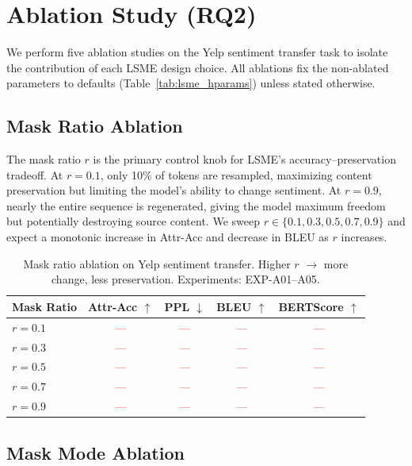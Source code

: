 \documentclass{article}
\newcommand{\tbd}[1]{\textcolor{red}{#1}}  %
\begin{document}
\section{Ablation Study (RQ2)}
\label{sec:ablation}

We perform five ablation studies on the Yelp sentiment transfer task to isolate the contribution of each LSME design choice. All ablations fix the non-ablated parameters to defaults (Table~\ref{tab:lsme_hparams}) unless stated otherwise.

\subsection{Mask Ratio Ablation}

The mask ratio $r$ is the primary control knob for LSME's accuracy--preservation tradeoff. At $r = 0.1$, only 10\% of tokens are resampled, maximizing content preservation but limiting the model's ability to change sentiment. At $r = 0.9$, nearly the entire sequence is regenerated, giving the model maximum freedom but potentially destroying source content. We sweep $r \in \{0.1, 0.3, 0.5, 0.7, 0.9\}$ and expect a monotonic increase in Attr-Acc and decrease in BLEU as $r$ increases.

\begin{table}[h]
\centering
\caption{Mask ratio ablation on Yelp sentiment transfer. Higher $r$ $\to$ more change, less preservation. Experiments: EXP-A01--A05.}
\label{tab:ablation_mask_ratio}
\begin{tabular}{lcccc}
\toprule
\textbf{Mask Ratio} & \textbf{Attr-Acc $\uparrow$} & \textbf{PPL $\downarrow$} & \textbf{BLEU $\uparrow$} & \textbf{BERTScore $\uparrow$} \\
\midrule
$r = 0.1$ & \tbd{---} & \tbd{---} & \tbd{---} & \tbd{---} \\
$r = 0.3$ & \tbd{---} & \tbd{---} & \tbd{---} & \tbd{---} \\
$r = 0.5$ & \tbd{---} & \tbd{---} & \tbd{---} & \tbd{---} \\
$r = 0.7$ & \tbd{---} & \tbd{---} & \tbd{---} & \tbd{---} \\
$r = 0.9$ & \tbd{---} & \tbd{---} & \tbd{---} & \tbd{---} \\
\bottomrule
\end{tabular}
\end{table}

\subsection{Mask Mode Ablation}
\end{document}
